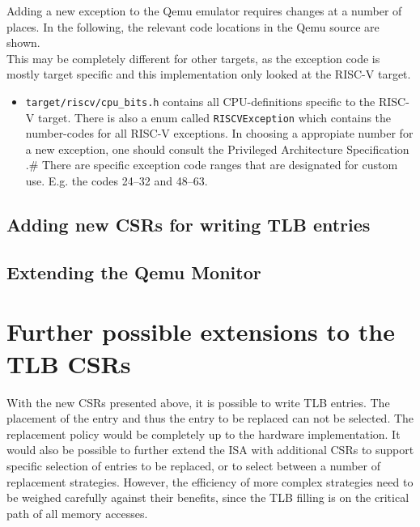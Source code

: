 Adding a new exception to the Qemu emulator requires changes at a number of places. In the following,
the relevant code locations in the Qemu source are shown.\\
This may be completely different for other targets, as the exception code is mostly target specific and
this implementation only looked at the RISC-V target.
\begin{itemize}
    \item \texttt{target/riscv/cpu\_bits.h} contains all CPU-definitions specific to the RISC-V target.
          There is also a enum called \texttt{RISCVException} which contains the number-codes for all RISC-V exceptions.
          In choosing a appropiate number for a new exception, one should consult the Privileged Architecture Specification \cite{RISCVInstructionSetII}.#
          There are specific exception code ranges that are designated for custom use. E.g. the codes 24--32 and 48--63.
\end{itemize}
\subsection{Adding new CSRs for writing TLB entries}

\subsection{Extending the Qemu Monitor}


\section{Further possible extensions to the TLB CSRs}
With the new CSRs presented above, it is possible to write TLB entries.
The placement of the entry and thus the entry to be replaced can not be selected.
The replacement policy would be completely up to the hardware implementation.
It would also be possible to further extend the ISA with additional CSRs to
support specific selection of entries to be replaced, or to select between
a number of replacement strategies.
However, the efficiency of more complex strategies need to be weighed carefully
against their benefits, since the TLB filling is on the critical path of all
memory accesses.

